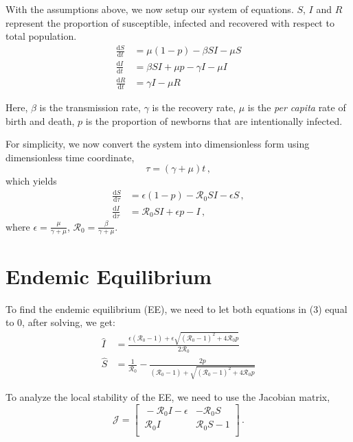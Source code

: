 \documentclass[12pt]{article}
\newcommand\dbyd[2]{\frac{\mathrm d{#1}}{\mathrm d{#2}}}
\newcommand{\R}{\mathcal{R}}
\begin{document}
With the assumptions above, we now setup our system of equations.
$S$, $I$ and $R$ represent the proportion of susceptible, infected and recovered with respect to total population.
\begin{equation}\label{1}
\begin{split}
\dbyd{S}{t}&=\mu(1-p)- \beta SI-\mu S \\
\dbyd{I}{t}&=\beta SI+\mu p-\gamma I -\mu I\\
\dbyd{R}{t}&=\gamma I-\mu R
\end{split}
\end{equation}

Here, $\beta$ is the transmission rate, $\gamma$ is the recovery rate,
$\mu$ is the \emph{per capita} rate of birth and death, $p$ is the
proportion of newborns that are intentionally infected.

For simplicity, we now convert the system into dimensionless form using dimensionless time coordinate,
\begin{equation}
\tau=(\gamma+\mu)t \,,
\end{equation}
which yields
\begin{subequations}
\begin{align}
\dbyd{S}{\tau}&=\epsilon(1-p)- \R_0  SI-\epsilon S \,,\\
\dbyd{I}{\tau}&=\R_0 SI+\epsilon p-I \,,
\end{align}
\end{subequations}
where $\epsilon=\frac{\mu}{\gamma+\mu}$, $\R_0=\frac{\beta}{\gamma+\mu}$.

\section{Endemic Equilibrium}

To find the endemic equilibrium (EE), we need to let both equations in (3) equal to 0, after solving, we get:
\begin{align}
\hat{I} &= \frac{\epsilon(\R_0 -1)+ \epsilon \sqrt{(\R_0-1)^2+4\R_0
    p}}{2\R_0} \\
\hat{S} &=\frac{1}{\R_0}-\frac{2p}{(\R_0 -1)+ \sqrt{(\R_0-1)^2+4\R_0 p}} 
\end{align}

To analyze the local stability of the EE, we need to use the Jacobian matrix,
\begin{equation}
\mathcal{J} =
\begin{bmatrix}
    \ -\R_0 I-\epsilon       & -\R_0 S \\
    \ \R_0 I       & \R_0 S-1 \\
\end{bmatrix} \,.
\end{equation}
\end{document}
